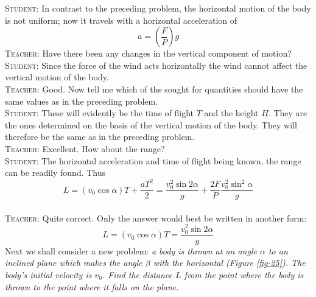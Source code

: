 \documentclass[a4paper,sfsidenotes]{tufte-book}
\begin{document}
\textsc{Student:} In contrast to the preceding problem, the horizontal motion of the body is not uniform; now it travels with a horizontal acceleration of 
$$
a= \left( \frac{F}{P} \right)g
$$
\textsc{Teacher:} Have there been any changes in the vertical component of motion?
\\
\textsc{Student:} Since the force of the wind acts horizontally the wind cannot affect the vertical motion of the body.
\\
\textsc{Teacher:} Good. Now tell me which of the sought for quantities should have the same values as in the preceding problem.
\\
\textsc{Student:} These will evidently be the time of flight $T$ and the height $H$. They are the ones determined on the basis of the vertical motion of the body. They will therefore be the same as in the preceding problem.
\\
\textsc{Teacher:} Excellent. How about the range?
\\
\textsc{Student:} The horizontal acceleration and time of flight being known, the range can be readily found. Thus
$$
L  = \left( v_{0} \cos \alpha \right)T + \frac{aT^{2}}{2} = \frac{v_{0}^{2} \sin 2 \alpha}{g} + \frac{2F}{P}\frac{v_{0}^{2} \sin^{2} \alpha}{g}
$$
\\
\textsc{Teacher:} Quite correct. Only the answer would best be written in another form:
\begin{equation}
L= (v_{0} \cos \alpha) T = \frac{v_{0}^{2} \sin 2 \alpha}{g}
\label{eq-18}
\end{equation}
Next we shall consider a new problem: \emph{a body is thrown at an angle $\alpha$ to an inclined plane which makes the angle $\beta$ with the horizontal (\emph{Figure \ref{fig-25}}). The body's initial velocity is $v_{0}$. Find the distance $L$ from the point where the body is thrown to the point where it falls on the plane.}
\\
\end{document}
